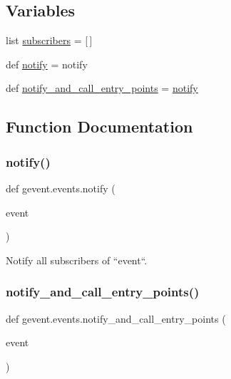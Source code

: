 \subsection*{Variables}
\begin{DoxyCompactItemize}
\item 
list \hyperlink{namespacegevent_1_1events_a0992540cbd7dc4b4e147c91d0b4cb432}{subscribers} = \mbox{[}$\,$\mbox{]}
\item 
def \hyperlink{namespacegevent_1_1events_a86be3ba1824a74be056ff9c217e485ad}{notify} = notify
\item 
def \hyperlink{namespacegevent_1_1events_a101a5593270ec6936095f74c4c7d6442}{notify\+\_\+and\+\_\+call\+\_\+entry\+\_\+points} = \hyperlink{namespacegevent_1_1events_a86be3ba1824a74be056ff9c217e485ad}{notify}
\end{DoxyCompactItemize}


\subsection{Function Documentation}
\mbox{\label{namespacegevent_1_1events_af0e705f2d952ae6508308d14be2fa3a2}} 
\subsubsection{\texorpdfstring{notify()}{notify()}}
{\footnotesize\ttfamily def gevent.\+events.\+notify (\begin{DoxyParamCaption}\item[{}]{event }\end{DoxyParamCaption})}

\begin{DoxyVerb}Notify all subscribers of ``event``.
\end{DoxyVerb}
 \mbox{\label{namespacegevent_1_1events_a1138bb5ebc2cd515da4e690c87ce2c69}} 
\subsubsection{\texorpdfstring{notify\+\_\+and\+\_\+call\+\_\+entry\+\_\+points()}{notify\_and\_call\_entry\_points()}}
{\footnotesize\ttfamily def gevent.\+events.\+notify\+\_\+and\+\_\+call\+\_\+entry\+\_\+points (\begin{DoxyParamCaption}\item[{}]{event }\end{DoxyParamCaption})}




